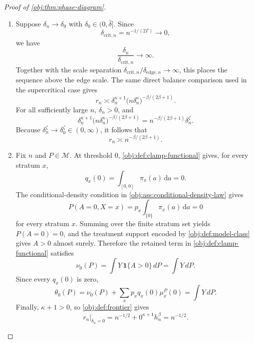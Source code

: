 \documentclass[11pt]{article}
\begin{document}
\begin{proof}[Proof of \cref{obj:thm:phase-diagram}]
\begin{enumerate}
\item Suppose \(\delta_n\to\delta_0\) with \(\delta_0\in(0,\bar\delta]\).  Since
\[
\delta_{\mathrm{crit},n}=n^{-1/(2\Gamma)}\to0,
\]
we have
\[
\frac{\delta_n}{\delta_{\mathrm{crit},n}}\to\infty .
\]
Together with the scale separation
\(\delta_{\mathrm{crit},n}/\delta_{\mathrm{edge},n}\to\infty\), this places the sequence above the
edge scale.
The same direct balance comparison used in the supercritical case gives
\[
r_n\asymp
\delta_n^{\kappa+1}
\bigl(n\delta_n^\kappa\bigr)^{-\beta/(2\beta+1)} .
\]
For all sufficiently large \(n\), \(\delta_n>0\), and
\[
\delta_n^{\kappa+1}
\bigl(n\delta_n^\kappa\bigr)^{-\beta/(2\beta+1)}
=
n^{-\beta/(2\beta+1)}\delta_n^\zeta .
\]
Because \(\delta_n^\zeta\to\delta_0^\zeta\in(0,\infty)\), it follows that
\[
r_n\asymp n^{-\beta/(2\beta+1)} .
\]

\item Fix \(n\) and \(P\in\mathcal M\).  At threshold \(0\),
\cref{obj:def:clamp-functional} gives, for every stratum \(x\),
\[
q_x(0)=\int_{[0,0]}\pi_x(a)\,\mathrm da=0 .
\]
The conditional-density condition in \cref{obj:ass:conditional-density-law}
gives
\[
P(A=0,X=x)=p_x\int_{\{0\}}\pi_x(a)\,\mathrm da=0
\]
for every stratum \(x\).  Summing over the finite stratum set yields
\(P(A=0)=0\), and the treatment support encoded by \cref{obj:def:model-class}
gives \(A>0\) almost surely.  Therefore the retained term in
\cref{obj:def:clamp-functional} satisfies
\[
\nu_0(P)
=
\int Y\,\mathbf 1\{A>0\}\,dP
=
\int Y\,dP .
\]
Since every \(q_x(0)\) is zero,
\[
\theta_0(P)
=
\nu_0(P)+\sum_x p_x q_x(0)\mu_x^P(0)
=
\int Y\,dP .
\]
Finally, \(\kappa+1>0\), so \cref{obj:def:frontier} gives
\[
r_n\big|_{\delta_n=0}
=
n^{-1/2}+0^{\kappa+1}h_n^\beta
=
n^{-1/2}.
\]


\end{enumerate}
\end{proof}
\end{document}
